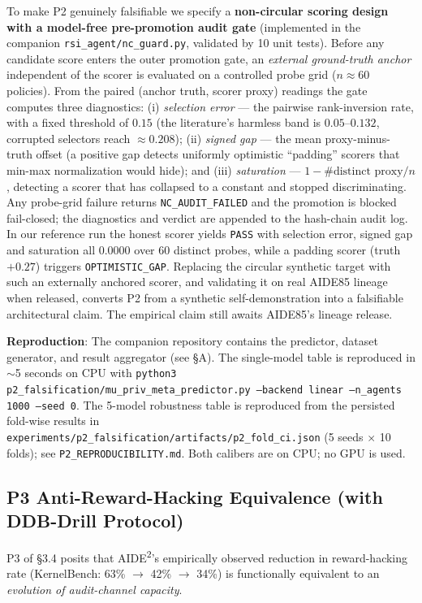 \documentclass{article}
\theoremstyle{definition}
\begin{document}
To make P2 genuinely falsifiable we specify a \textbf{non-circular scoring design with a model-free pre-promotion audit gate} (implemented in the companion \texttt{rsi\_agent/nc\_guard.py}, validated by 10 unit tests). Before any candidate score enters the outer promotion gate, an \emph{external ground-truth anchor} independent of the scorer is evaluated on a controlled probe grid ($n\approx 60$ policies). From the paired (anchor truth, scorer proxy) readings the gate computes three diagnostics: (i) \emph{selection error} — the pairwise rank-inversion rate, with a fixed threshold of $0.15$ (the literature's harmless band is $0.05$--$0.132$, corrupted selectors reach $\approx0.208$); (ii) \emph{signed gap} — the mean proxy-minus-truth offset (a positive gap detects uniformly optimistic ``padding'' scorers that min-max normalization would hide); and (iii) \emph{saturation} — $1-\#\text{distinct proxy}/n$, detecting a scorer that has collapsed to a constant and stopped discriminating. Any probe-grid failure returns \texttt{NC\_AUDIT\_FAILED} and the promotion is blocked fail-closed; the diagnostics and verdict are appended to the hash-chain audit log. In our reference run the honest scorer yields \texttt{PASS} with selection error, signed gap and saturation all $0.0000$ over 60 distinct probes, while a padding scorer (truth $+0.27$) triggers \texttt{OPTIMISTIC\_GAP}. Replacing the circular synthetic target with such an externally anchored scorer, and validating it on real AIDE85 lineage when released, converts P2 from a synthetic self-demonstration into a falsifiable architectural claim. The empirical claim still awaits AIDE85's lineage release.

\textbf{Reproduction}: The companion repository contains the predictor, dataset generator, and result aggregator (see \S A). The single-model table is reproduced in $\sim$5 seconds on CPU with \texttt{python3 p2\_falsification/mu\_priv\_meta\_predictor.py --backend linear --n\_agents 1000 --seed 0}. The 5-model robustness table is reproduced from the persisted fold-wise results in \texttt{experiments/p2\_falsification/artifacts/p2\_fold\_ci.json} (5 seeds $\times$ 10 folds); see \texttt{P2\_REPRODUCIBILITY.md}. Both calibers are on CPU; no GPU is used.

\subsection{P3 Anti-Reward-Hacking Equivalence (with DDB-Drill Protocol)}

P3 of \S3.4 posits that AIDE\textsuperscript{2}'s empirically observed reduction in reward-hacking rate (KernelBench: 63\% $\to$ 42\% $\to$ 34\%) is functionally equivalent to an \emph{evolution of audit-channel capacity}.
\end{document}
